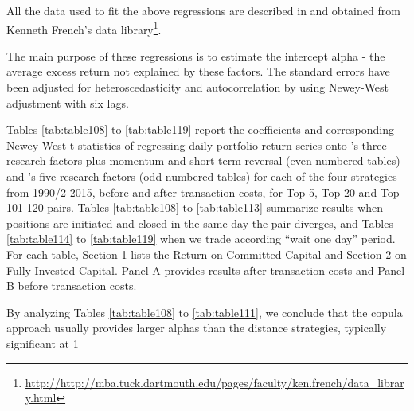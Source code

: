 \documentclass[a4paper]{article}
\begin{document}
	All the data used to fit the above regressions are described in and obtained from Kenneth French’s data library\footnote{\url{http://http://mba.tuck.dartmouth.edu/pages/faculty/ken.french/data_library.html}}.
	
	The main purpose of these regressions is to estimate the intercept alpha - the average excess return not explained by these factors. The standard errors have been adjusted for heteroscedasticity and autocorrelation by using Newey-West adjustment with six lags.
	
	Tables \ref{tab:table108} to \ref{tab:table119} report the coefficients and corresponding Newey-West t-statistics of regressing daily portfolio return series onto \citet*{ff93}'s three research factors plus momentum and short-term reversal (even numbered tables) and \citet*{ff15}'s five research factors (odd numbered tables) for each of the four strategies from 1990/2-2015, before and after transaction costs, for Top 5, Top 20 and Top 101-120 pairs. Tables \ref{tab:table108} to \ref{tab:table113} summarize results when positions are initiated and closed in the same day the pair diverges, and Tables \ref{tab:table114} to \ref{tab:table119} when we trade according ``wait one day'' period. For each table, Section 1 lists the Return on Committed Capital and Section 2 on Fully Invested Capital. Panel A provides results after transaction costs and Panel B before transaction costs.
	
	By analyzing Tables \ref{tab:table108} to \ref{tab:table111}, we conclude that the copula approach usually provides larger alphas than the distance strategies, typically significant at 1\\%
	
\end{document}
